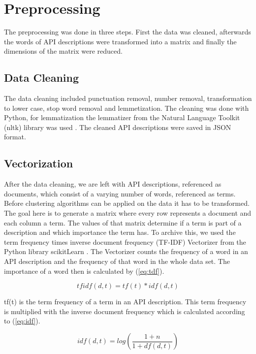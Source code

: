 \documentclass[a4paper]{IEEEtran}
\begin{document}
\section{Preprocessing}
The preprocessing was done in three steps. First the data was cleaned, afterwards the words of API descriptions were transformed into a matrix and finally the dimensions of the matrix were reduced.

\subsection{Data Cleaning}
The data cleaning included punctuation removal, number removal, transformation to lower case, stop word removal and lemmetization. The cleaning was done with Python, for lemmatization the lemmatizer from the Natural Language Toolkit (nltk) library was used \cite{bird2009natural}. The cleaned API descriptions were saved in JSON format.

\subsection{Vectorization}
After the data cleaning, we are left with API descriptions, referenced as documents, which consist of a varying number of words, referenced as terms. Before clustering algorithms can be applied on the data it has to be transformed. The goal here is to generate a matrix where every row represents a document and each column a term. The values of that matrix determine if a term is part of a description and which importance the term has. To archive this, we used the term frequency times inverse document frequency (TF-IDF) Vectorizer from the Python library scikitLearn \cite{scikit-learn}. The Vectorizer counts the frequency of a word in an API description and the frequency of that word in the whole data set. The importance of a word then is calculated by (\ref{eq:tdf}).

\begin{equation}
\label{eq:tdf}
tfidf (d,t) = tf(t) * idf(d,t) 
\end{equation}

tf(t) is the term frequency of a term in an API description. This term frequency is multiplied with the inverse document frequency which is calculated according to (\ref{eq:idf}).

\begin{equation}
\label{eq:idf}
idf (d,t) = log\left( \frac{1+n}{1+df(d,t)} \right)
\end{equation}
\end{document}
